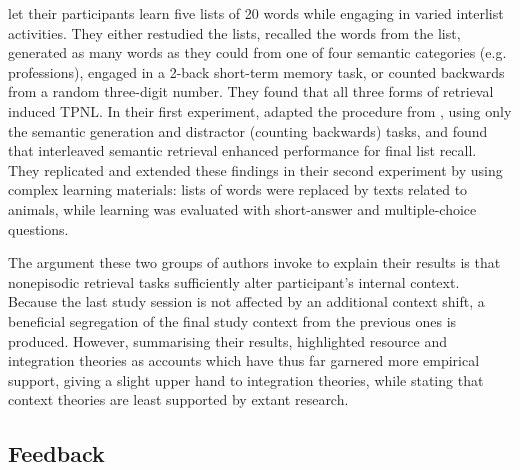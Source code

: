 \documentclass[../main.tex]{subfiles}
\begin{document}
\cite{pastotterRetrievalLearningFacilitates2011} let their participants learn five lists of 20 words while engaging in varied interlist activities. They either restudied the lists, recalled the words from the list, generated as many words as they could from one of four semantic categories (e.g. professions), engaged in a 2-back short-term memory task, or counted backwards from a random three-digit number. They found that all three forms of retrieval induced TPNL. In their first experiment, \cite{divisRetrievalSpeedsContext2014} adapted the procedure from \cite{pastotterRetrievalLearningFacilitates2011}, using only the semantic generation and distractor (counting backwards) tasks, and found that interleaved semantic retrieval enhanced performance for final list recall. They replicated and extended these findings in their second experiment by using complex learning materials: lists of words were replaced by texts related to animals, while learning was evaluated with short-answer and multiple-choice questions. 

The argument these two groups of authors invoke to explain their results is that nonepisodic retrieval tasks sufficiently alter participant's internal context. Because the last study session is not affected by an additional context shift, a beneficial segregation of the final study context from the previous ones is produced. However, summarising their results, \cite{chanRetrievalPotentiatesNew2018} highlighted resource and integration theories as accounts which have thus far garnered more empirical support, giving a slight upper hand to integration theories, while stating that context theories are least supported by extant research.


\hypertarget{feedback}{%
\subsection{Feedback}}
\end{document}
